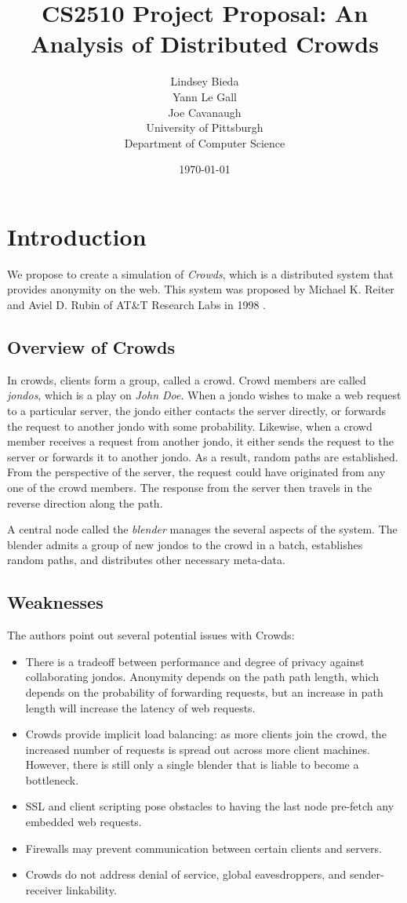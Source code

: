 \documentclass[12pt]{article}
\title{CS2510 Project Proposal:
An Analysis of Distributed Crowds}
\author{
		Lindsey Bieda \\
        Yann Le Gall \\
		Joe Cavanaugh \\
		University of Pittsburgh \\ 
        Department of Computer Science \\
}
\date{\today}
\begin{document}
\maketitle


\section{Introduction}

We propose to create a simulation of \emph{Crowds}, which is a distributed
system that provides anonymity on the web. This system was proposed by
Michael K. Reiter and Aviel D. Rubin of AT\&T Research Labs in 1998 \cite{reiter}.

\subsection{Overview of Crowds}
In crowds, clients form a group, called a crowd. Crowd members are called
 \emph{jondos}, which is a play on \emph{John Doe}. When a jondo wishes to
make a web request to a particular server, the jondo either contacts
the server directly, or forwards the request to another jondo with
some probability. Likewise, when a crowd member receives a request from
another jondo, it either sends the request to the server or forwards it
to another jondo. As a result, random paths are
established. From the perspective of the server, the request could
have originated from any one of the crowd members. The response from the
server then travels in the reverse direction along the path.

A central node called the \emph{blender} manages the several aspects of
the system. The blender admits a group of new jondos to the crowd in a
batch, establishes random paths, and distributes other necessary
meta-data.

\subsection{Weaknesses}
The authors point out several potential issues with Crowds:

\begin{itemize}
	\item There is a tradeoff between performance and degree of privacy
	against collaborating jondos. Anonymity depends on the path
	path length, which depends on the probability of forwarding
	requests, but an increase in path length will increase the latency
	of web requests.
	\item Crowds provide implicit load balancing: as more clients
	join the crowd, the increased number of requests is spread out
	across more client machines. However, there is still only a single
	blender that is liable to become a bottleneck.
	\item SSL and client scripting pose obstacles to having the last node
	pre-fetch any embedded web requests.
	\item Firewalls may prevent communication between certain clients
	and servers.
	\item Crowds do not address denial of service, global eavesdroppers,
	and sender-receiver linkability.
\end{itemize}
\end{document}
